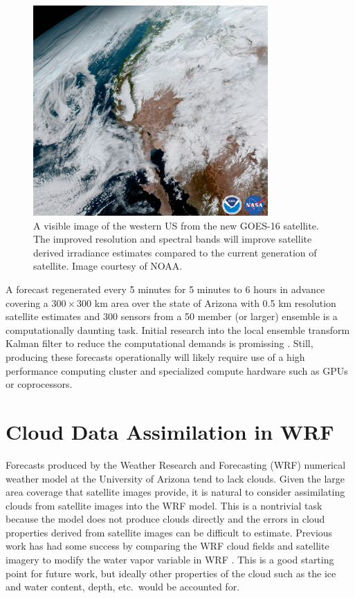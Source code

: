 \begin{figure}[h]
\centering
\includegraphics[width=0.8\textwidth]{figs/goes_cal.jpg}
\caption[An visible image of the western US from GOES-16]{A visible
image of the western US from the new GOES-16 satellite. The improved
resolution and spectral bands will improve satellite derived
irradiance estimates compared to the current generation of
satellite. Image courtesy of NOAA.}
\label{fig:goes_cal}
\end{figure}

A forecast regenerated every 5 minutes for 5 minutes to 6 hours in
advance covering a $300 \times 300$ km area over the state of Arizona
with 0.5 km resolution satellite estimates and 300 sensors from a 50
member (or larger) ensemble is a computationally daunting task.
Initial research into the local ensemble transform Kalman filter to
reduce the computational demands is promissing \citep{Hunt2007}.
Still, producing these forecasts operationally will likely require use
of a high performance computing cluster and specialized compute
hardware such as GPUs or coprocessors.

\section{Cloud Data Assimilation in WRF}

Forecasts produced by the Weather Research and Forecasting (WRF)
numerical weather model at the University of Arizona tend to lack
clouds.
Given the large area coverage that satellite images provide, it is
natural to consider assimilating clouds from satellite images into the
WRF model.
This is a nontrivial task because the model does not produce clouds
directly and the errors in cloud properties derived from satellite
images can be difficult to estimate.
Previous work has had some success by comparing the WRF cloud fields
and satellite imagery to modify the water vapor variable in WRF
\citep{Mathiesen2013}.
This is a good starting point for future work, but ideally other
properties of the cloud such as the ice and water content, depth,
etc.\ would be accounted for.

